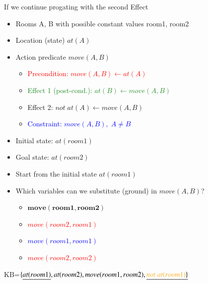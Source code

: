 If we continue progating with the second Effect

\begin{minipage}[t]{0.5\textwidth}
    \begin{itemize}
        \item Rooms A, B with possible constant values room1, room2
        \item Location (state) $at(A)$
        \item Action predicate $move(A, B)$
        \begin{itemize}
            \item \textcolor{red}{Precondition: $move(A, B) \leftarrow at(A)$}
            \item \textcolor{ForestGreen}{Effect 1 (post-cond.): $at(B) \leftarrow move(A, B)$}
            \item \textcolor{Dandelion}{Effect 2: $not\;at(A) \leftarrow move(A, B)$}
            \item \textcolor{blue}{Constraint: $move(A, B),\;A \ne B$}
        \end{itemize}
        \item Initial state: $at(room1)$
        \item Goal state: $at(room2)$
    \end{itemize}
\end{minipage}
\begin{minipage}[t]{0.8\textwidth}
    \begin{itemize}
        \item Start from the initial state $at(room1)$
        \item Which variables can we substitute (ground) in $move(A, B)$?
        \begin{itemize}
            \item $\bm{move(room1, room2)}$
            \item \textcolor{red}{\st{$move(room2, room1)$}}
            \item \textcolor{blue}{\st{$move(room1, room1)$}}
            \item \textcolor{red}{\st{$move(room2, room2)$}}
        \end{itemize}
    \end{itemize}
\end{minipage}

KB=$\{\underline{at(room1)}, at(room2), move(room1,room2), \underline{\textcolor{Dandelion}{not\;at(room1)}\}}$


